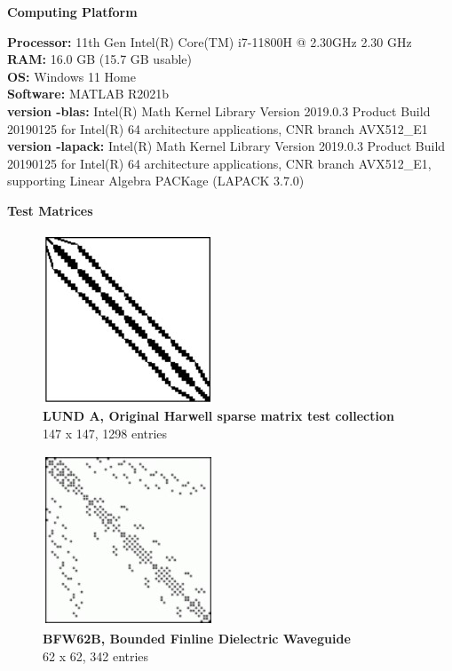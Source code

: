 \documentclass[12pt]{article}
\begin{document}
\begingroup

\fontsize{16pt}{12pt}\selectfont
\centering \textbf{Computing Platform}

\endgroup

\raggedright

\hspace{1cm}

\quad \textbf{Processor:} 11th Gen Intel(R) Core(TM) i7-11800H @ 2.30GHz   2.30 GHz \\
\quad \textbf{RAM:} 16.0 GB (15.7 GB usable) \\
\quad \textbf{OS:} Windows 11 Home \\
\quad \textbf{Software:} MATLAB R2021b\\
\quad \textbf{version -blas:} Intel(R) Math Kernel Library Version 2019.0.3 Product Build 20190125 for Intel(R) 64 architecture applications, CNR branch AVX512\_E1 \\
\quad \textbf{version -lapack:} Intel(R) Math Kernel Library Version 2019.0.3 Product Build 20190125 for Intel(R) 64 architecture applications, CNR branch AVX512\_E1, supporting Linear Algebra PACKage (LAPACK 3.7.0) \\[0.75in]

\begingroup

\fontsize{16pt}{12pt}\selectfont
	\centering \textbf{Test Matrices}

\endgroup

\begin{figure}[h]
	\centerline{\includegraphics[scale=.7]{lunda.jpg}}
	\caption{\textbf{LUND A, Original Harwell sparse matrix test collection} \\ 147 x 147, 1298 entries}
	\label{fig1}
\end{figure}


\begin{figure}[h]
	\centerline{\includegraphics[scale=.7]{bfw.jpg}}
	\caption{\textbf{BFW62B, Bounded Finline Dielectric Waveguide} \\
	62 x 62, 342 entries}
	\label{fig2}
\end{figure}
\end{document}
